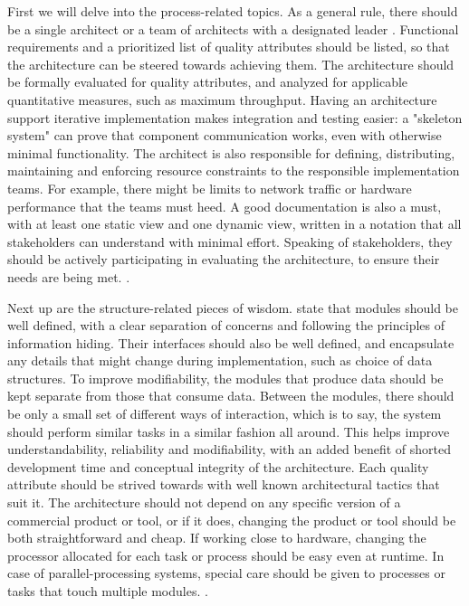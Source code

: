 \documentclass[utf8,english]{gradu3}
\begin{document}
First we will delve into the process-related topics. As a general rule, there
should be a single architect or a team of architects with a designated leader
\parencite[15]{Bass1998}. Functional requirements and a prioritized list of quality
attributes should be listed, so that the architecture can be steered towards
achieving them. The architecture should be formally evaluated for quality
attributes, and analyzed for applicable quantitative measures, such as maximum
throughput. Having an architecture support iterative implementation makes
integration and testing easier: a "skeleton system" can prove that component
communication works, even with otherwise minimal functionality. The architect is
also responsible for defining, distributing, maintaining and enforcing resource
constraints to the responsible implementation teams. For example, there might be
limits to network traffic or hardware performance that the teams must heed. A
good documentation is also a must, with at least one static view and one dynamic
view, written in a notation that all stakeholders can understand with minimal
effort. Speaking of stakeholders, they should be actively participating in
evaluating the architecture, to ensure their needs are being met. \parencite[15]{Bass1998}. 

Next up are the structure-related pieces of wisdom. \textcite[16]{Bass1998} state that
modules should be well defined, with a clear separation of concerns and
following the principles of information hiding. Their interfaces should also be
well defined, and encapsulate any details that might change during
implementation, such as choice of data structures. To improve modifiability, the
modules that produce data should be kept separate from those that consume data.
Between the modules, there should be only a small set of different ways of
interaction, which is to say, the system should perform similar tasks in a
similar fashion all around. This helps improve understandability, reliability
and modifiability, with an added benefit of shorted development time and
conceptual integrity of the architecture. Each quality attribute should be
strived towards with well known architectural tactics that suit it. The
architecture should not depend on any specific version of a commercial product
or tool, or if it does, changing the product or tool should be both
straightforward and cheap. If working close to hardware, changing the processor
allocated for each task or process should be easy even at runtime. In case of
parallel-processing systems, special care should be given to processes or tasks
that touch multiple modules. \parencite[16]{Bass1998}.
\end{document}
